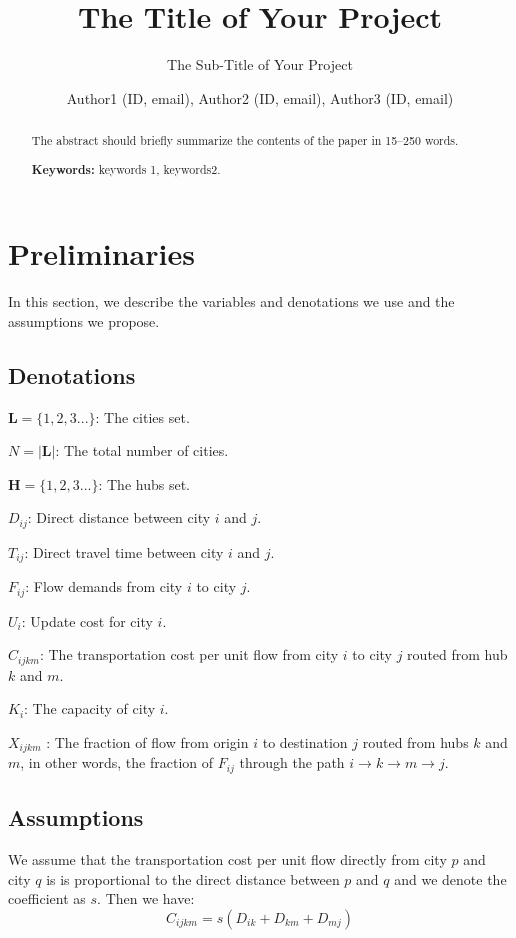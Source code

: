 \documentclass{llncs}
\title{The Title of Your Project}
\subtitle{The Sub-Title of Your Project \vspace{-3mm}}
\author{Author1 (ID, email), Author2 (ID, email), Author3 (ID, email)}
\institute{Department of Computer Science, \\ Shanghai Jiao Tong University, Shanghai, China}
\begin{document}
	
	
	
	\maketitle
	\begin{abstract}\vspace{-5mm}
		The abstract should briefly summarize the contents of the paper in
		15--250 words.
		
		\textbf{Keywords:} keywords 1, keywords2.
	\end{abstract}
	
\section{Preliminaries}
	In this section, we describe the variables and denotations we use and the assumptions we propose.
\subsection{Denotations}
	
	$\mathbf{L} = \{1,2,3...\}$: The cities set.
	
	$N = |\mathbf{L}|$: The total number of cities.
	
	$\mathbf{H} = \{1,2,3...\}$: The hubs set. 
	
	$D_{ij}$: Direct distance between city $i$ and $j$.
	
	$T_{ij}$: Direct travel time between city $i$ and $j$.
	
	$F_{ij}$: Flow demands from city $i$ to city $j$.
	
	$U_i$: Update cost for city $i$.
	
	$C_{ijkm}$: The transportation cost per unit flow from city $i$ to city $j$ routed from hub $k$ and $m$.

	$K_{i}$: The capacity of city $i$.
	
	$X_{ijkm}$ : The fraction of flow from origin $i$ to destination $j$ routed from hubs $k$ and $m$, in other words, the fraction of $F_{ij}$ through the path $i \rightarrow k \rightarrow m\rightarrow j$.
\subsection{Assumptions}
	
	We assume that the transportation cost per unit flow directly from city $p$ and city $q$ is is proportional to the direct distance between $p$ and $q$ and we denote the coefficient as $s$. Then we have:
	\begin{equation}
	C_{ijkm} = s(D_{ik}+D_{km}+D_{mj})
	\label{eq:c}
	\end{equation}
	
\end{document}
